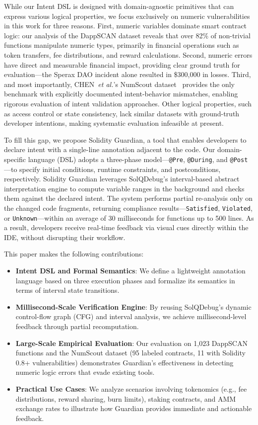 \documentclass[pdflatex,sn-basic]{sn-jnl}%
\theoremstyle{thmstyleone}%
\theoremstyle{thmstyletwo}%
\theoremstyle{thmstylethree}%
\begin{document}
While our Intent DSL is designed with domain-agnostic primitives that can express various logical properties, we focus exclusively on numeric vulnerabilities in this work for three reasons. First, numeric variables dominate smart contract logic: our analysis of the DappSCAN dataset reveals that over 82\% of non-trivial functions manipulate numeric types, primarily in financial operations such as token transfers, fee distributions, and reward calculations. Second, numeric errors have direct and measurable financial impact, providing clear ground truth for evaluation—the Sperax DAO incident alone resulted in \$300,000 in losses. Third, and most importantly, CHEN~\textit{et al.}'s NumScout dataset~\citep{numscout} provides the only benchmark with explicitly documented intent-behavior mismatches, enabling rigorous evaluation of intent validation approaches. Other logical properties, such as access control or state consistency, lack similar datasets with ground-truth developer intentions, making systematic evaluation infeasible at present.

To fill this gap, we propose Solidity Guardian, a tool that enables developers to declare intent with a single-line annotation adjacent to the code.  
Our domain-specific language (DSL) adopts a three-phase model—\texttt{@Pre}, \texttt{@During}, and \texttt{@Post}—to specify initial conditions, runtime constraints, and postconditions, respectively. Solidity Guardian leverages SolQDebug's interval-based abstract interpretation engine to compute variable ranges in the background and checks them against the declared intent.  
The system performs partial re-analysis only on the changed code fragments, returning compliance results—\texttt{Satisfied}, \texttt{Violated}, or \texttt{Unknown}—within an average of 30 milliseconds for functions up to 500 lines.  
As a result, developers receive real-time feedback via visual cues directly within the IDE, without disrupting their workflow.

This paper makes the following contributions:
\begin{itemize}
    \item \textbf{Intent DSL and Formal Semantics}: We define a lightweight annotation language based on three execution phases and formalize its semantics in terms of interval state transitions.
    \item \textbf{Millisecond-Scale Verification Engine}: By reusing SolQDebug’s dynamic control-flow graph (CFG) and interval analysis, we achieve millisecond-level feedback through partial recomputation.
    \item \textbf{Large-Scale Empirical Evaluation}: Our evaluation on 1,023 DappSCAN functions and the NumScout dataset (95 labeled contracts, 11 with Solidity 0.8+ vulnerabilities) demonstrates Guardian's effectiveness in detecting numeric logic errors that evade existing tools.
    \item \textbf{Practical Use Cases}: We analyze scenarios involving tokenomics (e.g., fee distributions, reward sharing, burn limits), staking contracts, and AMM exchange rates to illustrate how Guardian provides immediate and actionable feedback.
\end{itemize}
\end{document}
